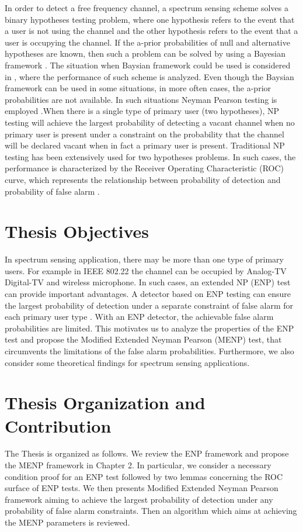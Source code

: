 In order to detect a free frequency channel, a spectrum sensing scheme solves a binary hypotheses testing problem, where one hypothesis refers to the event that a user is not using the channel and the other hypothesis refers to the event that a user is occupying the channel. If the a-prior probabilities of null and alternative hypotheses are known, then such a problem can be solved by using a Bayesian framework \cite{poor1994introduction}. The situation when Baysian framework could be used is considered in \cite{zeng2010review}, where  the performance of such scheme is analyzed.
Even though the Baysian framework can be used in some situations, in more often cases, the a-prior probabilities are not available. In such situations Neyman Pearson testing is employed \cite{poor1994introduction}.When there is a single type of primary user (two hypotheses), NP testing will achieve the largest probability of detecting a vacant channel when no primary user is present under a constraint on the probability that the channel will be declared vacant when in fact a primary user is present.
Traditional NP testing has been extensively used for two hypotheses problems. In such cases,  the performance is characterized by the Receiver Operating Characteristic (ROC) curve, which represents the relationship between probability of detection and probability of false alarm \cite{poor1994introduction}. 

\section{Thesis Objectives}
In spectrum sensing application, there may be more than one type of primary users. For example in IEEE 802.22  the channel can be occupied by Analog-TV Digital-TV and wireless microphone\cite{shellhammer2008spectrum}. 
In such cases, an extended NP (ENP) test  \cite{LehmannTest} can provide important advantages. A detector based on ENP testing can ensure the largest probability of detection under a separate constraint of false alarm for each primary user type \cite{LehmannTest}.
With an ENP detector, the achievable false alarm probabilities are limited. This motivates us to analyze the properties of the ENP test and propose the Modified Extended Neyman Pearson (MENP) test, that circumvents the limitations of the false alarm probabilities. Furthermore, we also consider some theoretical  findings for spectrum sensing applications.  

\section{Thesis Organization and Contribution}
The Thesis is organized as follows. We review the ENP framework and propose the MENP framework in Chapter 2. In particular,  we consider  a necessary condition proof for an  ENP test followed by  two lemmas concerning the ROC surface of ENP tests. 
We then presents Modified Extended Neyman Pearson framework aiming to  achieve the largest probability of detection  under any probability of false alarm constraints.
Then an algorithm which aims at achieving the MENP parameters is reviewed. 

